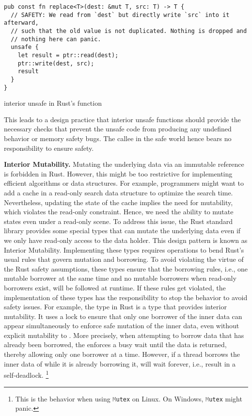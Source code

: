 \begin{listing}[hbtp]
    \begin{verbatim}
pub const fn replace<T>(dest: &mut T, src: T) -> T {
  // SAFETY: We read from `dest` but directly write `src` into it afterward,
  // such that the old value is not duplicated. Nothing is dropped and
  // nothing here can panic.
  unsafe {
    let result = ptr::read(dest);
    ptr::write(dest, src);
    result
  }
}
    \end{verbatim}
    \caption{interior unsafe in Rust's  function}
    \label{lst:interiorunsafe}
    \vspace{-0.2cm}
\end{listing}

This leads to a design practice that interior unsafe functions should provide
the necessary checks that prevent the unsafe code from producing any undefined
behavior or memory safety bugs.
The callee in the safe world hence bears no responsibility to ensure safety.

\textbf{Interior Mutability.}
Mutating the underlying data via an immutable reference
is forbidden in Rust.
However, this might be too restrictive for
implementing efficient algorithms or data structures.
For example, programmers might want to add a cache
in a read-only search data structure
to optimize the search time.
Nevertheless, updating the state of the cache implies
the need for mutability,
which violates the read-only constraint.
Hence, we need the ability to mutate states even under a read-only scene.
To address this issue,
the Rust standard library provides some special types
that can mutate the underlying data
even if we only have read-only access to the data holder.
This design pattern is known as Interior Mutability.
Implementing these types requires  operations
to bend Rust's usual rules that govern mutation and borrowing.
To avoid violating the virtue of the Rust safety assumptions,
these types ensure that the borrowing rules,
i.e., one mutable borrower at the same time
and no mutable borrowers when read-only borrowers exist,
will be followed at runtime.
If these rules get violated,
the implementation of these types has the responsibility
to stop the behavior to avoid safety issues.
For example, the type  in Rust is a type that provides
interior mutability.
It uses a lock to ensure that
only one borrower of the inner data can appear simultaneously
to enforce safe mutation of the inner data, even without explicit mutability to .
More precisely, when attempting to borrow data that has already been borrowed,
the  enforces a busy wait until the data is returned,
thereby allowing only one borrower at a time.
However, if a thread borrows the inner data of  while it is already borrowing it,
 will wait forever, i.e., result in a self-deadlock.
\footnote{This is the behavior when using \texttt{\textcolor{gray}Mutex} on Linux.
On Windows, \texttt{\textcolor{gray}Mutex} might panic.}

